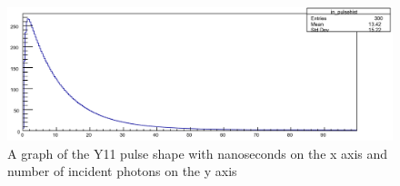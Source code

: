 \begin{figure}
\centering
\includegraphics[width=\linewidth]{Y11.png}
\caption{A graph of the Y11 pulse shape with nanoseconds on the x axis and number of incident photons on the y axis}
\label{fig:Y11}
\end{figure}

